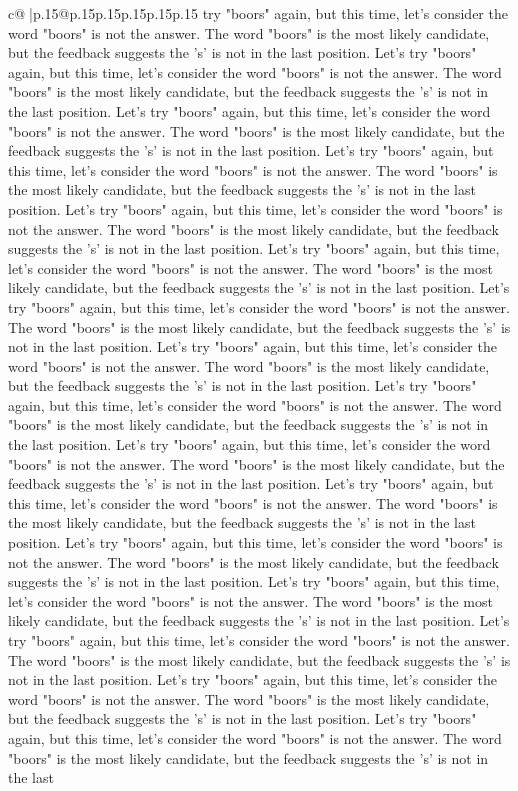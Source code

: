 \documentclass{article}
\begin{document}
{\begin{supertabular}{c@{$\;$}|p{.15\linewidth}@{}p{.15\linewidth}p{.15\linewidth}p{.15\linewidth}p{.15\linewidth}p{.15\linewidth}}
{{{try "boors" again, but this time, let's consider the word "boors" is not the answer. The word "boors" is the most likely candidate, but the feedback suggests the 's' is not in the last position. Let's try "boors" again, but this time, let's consider the word "boors" is not the answer. The word "boors" is the most likely candidate, but the feedback suggests the 's' is not in the last position. Let's try "boors" again, but this time, let's consider the word "boors" is not the answer. The word "boors" is the most likely candidate, but the feedback suggests the 's' is not in the last position. Let's try "boors" again, but this time, let's consider the word "boors" is not the answer. The word "boors" is the most likely candidate, but the feedback suggests the 's' is not in the last position. Let's try "boors" again, but this time, let's consider the word "boors" is not the answer. The word "boors" is the most likely candidate, but the feedback suggests the 's' is not in the last position. Let's try "boors" again, but this time, let's consider the word "boors" is not the answer. The word "boors" is the most likely candidate, but the feedback suggests the 's' is not in the last position. Let's try "boors" again, but this time, let's consider the word "boors" is not the answer. The word "boors" is the most likely candidate, but the feedback suggests the 's' is not in the last position. Let's try "boors" again, but this time, let's consider the word "boors" is not the answer. The word "boors" is the most likely candidate, but the feedback suggests the 's' is not in the last position. Let's try "boors" again, but this time, let's consider the word "boors" is not the answer. The word "boors" is the most likely candidate, but the feedback suggests the 's' is not in the last position. Let's try "boors" again, but this time, let's consider the word "boors" is not the answer. The word "boors" is the most likely candidate, but the feedback suggests the 's' is not in the last position. Let's try "boors" again, but this time, let's consider the word "boors" is not the answer. The word "boors" is the most likely candidate, but the feedback suggests the 's' is not in the last position. Let's try "boors" again, but this time, let's consider the word "boors" is not the answer. The word "boors" is the most likely candidate, but the feedback suggests the 's' is not in the last position. Let's try "boors" again, but this time, let's consider the word "boors" is not the answer. The word "boors" is the most likely candidate, but the feedback suggests the 's' is not in the last position. Let's try "boors" again, but this time, let's consider the word "boors" is not the answer. The word "boors" is the most likely candidate, but the feedback suggests the 's' is not in the last position. Let's try "boors" again, but this time, let's consider the word "boors" is not the answer. The word "boors" is the most likely candidate, but the feedback suggests the 's' is not in the last position. Let's try "boors" again, but this time, let's consider the word "boors" is not the answer. The word "boors" is the most likely candidate, but the feedback suggests the 's' is not in the last }}}
\end{supertabular}}
\end{document}
